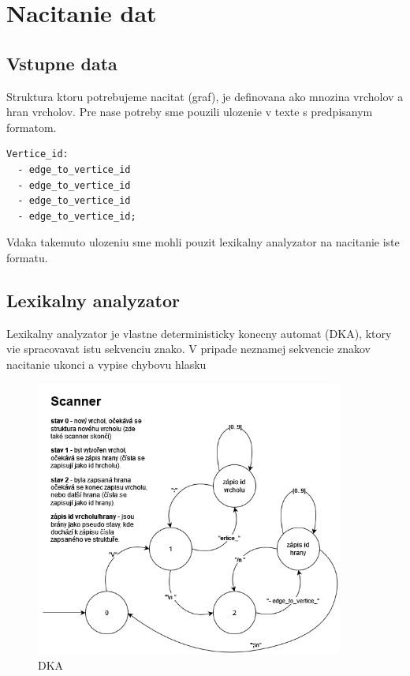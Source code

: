 \section{Nacitanie dat}

\subsection{Vstupne data}
Struktura ktoru potrebujeme nacitat (graf), je definovana ako mnozina vrcholov a hran vrcholov. Pre nase potreby
sme pouzili ulozenie v texte s predpisanym formatom.

\begin{lstlisting}
Vertice_id:
  - edge_to_vertice_id
  - edge_to_vertice_id
  - edge_to_vertice_id
  - edge_to_vertice_id;
\end{lstlisting}

Vdaka takemuto ulozeniu sme mohli pouzit lexikalny analyzator na nacitanie
iste formatu.

\subsection{Lexikalny analyzator}
Lexikalny analyzator je vlastne deterministicky konecny automat (DKA), ktory vie spracovavat istu sekvenciu znako. V pripade neznamej
sekvencie znakov nacitanie ukonci a vypise chybovu hlasku

\begin{figure}[h]
    \centering
    \includegraphics[width=0.9\textwidth]{doc/fig/Scanner_automat_Final.drawio.png}
    \caption{DKA}
    \label{fig:DKA}
\end{figure}


\newpage
